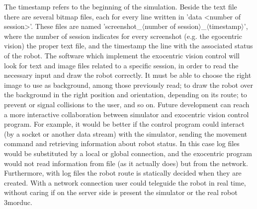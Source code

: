 \newline 
\newline The timestamp refers to the beginning of the simulation.
\newline Beside the text file there are several bitmap files, each for every line written in 'data <number of session>'. These 
files are named 'screenshot\_$\langle$number of session$\rangle$\_$\langle$timestamp$\rangle$', where the number of session indicates for every screenshot (e.g.
the egocentric vision) the proper text file, and the timestamp the line with the associated status of the robot.
\newline The software which implement the exocentric vision control will look for text and image files related to a specific 
session, in order to read the necessary input and draw the robot correctly. It must be able to choose the right image to use as 
background, among those previously read; to draw the robot over the background in the right position and orientation, depending 
on its route; to prevent or signal collisions to the user, and so on.
\newline Future development can reach a more interactive collaboration between simulator and exocentric vision control program. For
example, it would be better if the control program could interact (by a socket or another data stream) with the simulator, sending
the movement command and retrieving information about robot status. In this case log files would be substituted by a local or 
global connection, and the exocentric program would not read information from file (as it actually does) but from the network.
Furthermore, with log files the robot route is statically decided when they are created. With a network connection user
could teleguide the robot in real time, without caring if on the server side is present the simulator or the real robot 3morduc.
